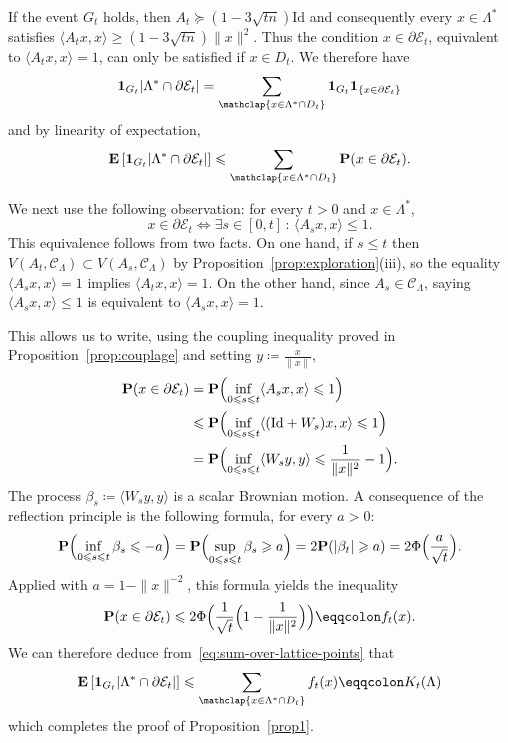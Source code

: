 \documentclass[12pt]{amsart}
\newcommand{\E}{\mathbf{E}}
\renewcommand{\P}{\mathbf{P}}
\newcommand{\Id}{\mathrm{Id}}
\newcommand{\scalar}[2]{\langle #1 , #2\rangle}
\renewcommand{\leq}{\leqslant}
\renewcommand{\geq}{\geqslant}
\theoremstyle{plain}
\theoremstyle{remark}
\begin{document}
If the event $G_t$ holds, then $A_t \succcurlyeq (1-3 \sqrt{tn}) \Id$ and consequently every $x \in \Lambda^*$ satisfies $\scalar{A_tx}{x} \geq (1-3\sqrt{tn}) \|x\|^2$. Thus the condition $x \in \partial \mathcal{E}_t$, equivalent to $\scalar{A_tx}{x}=1$, can only be satisfied if $x \in D_t$. We therefore have
\[ {\bf 1}_{G_t} |\Lambda^* \cap \partial\mathcal{E}_t|
= \sum_{\mathclap{x \in \Lambda^* \cap D_t}} {\bf 1}_{G_t} {\bf 1}_{\{
x \in \partial\mathcal{E}_t\}}
\]
and by linearity of expectation,
\begin{equation} \label{eq:sum-over-lattice-points}
\E \left[ {\bf 1}_{G_t} |\Lambda^* \cap \partial\mathcal{E}_t| \right]
\leq \sum_{\mathclap{x \in \Lambda^* \cap D_t}} \P(x \in \partial\mathcal{E}_t).
\end{equation}
 
We next use the following observation: for every $t>0$ and $x \in \Lambda^*$,
\[ x \in  \partial\mathcal{E}_t \iff \exists s \in [0,t] \, : \, \scalar{A_sx}{x} \leq 1 .\]
This equivalence follows from two facts. On one hand,
if $s \leq t$ then $V(A_t,\mathscr{C}_\Lambda) \subset V(A_s,\mathscr{C}_\Lambda)$ by Proposition~\ref{prop:exploration}(iii), so the equality $\scalar{A_sx}{x} = 1$ implies $\scalar{A_tx}{x}=1$. On the other hand, since $A_s \in \mathscr{C}_\Lambda$, saying $\scalar{A_sx}{x} \leq 1$ is equivalent to $\scalar{A_sx}{x} = 1$.
 
This allows us to write, using the coupling inequality proved in Proposition~\ref{prop:couplage} and setting $y \coloneqq \frac{x}{\|x\|}$,
\begin{align*} \P(x \in \partial\mathcal{E}_t) & =
 \P \Bigl( \inf_{0 \leq s \leq t} \scalar{A_sx}{x} \leq 1 \Bigr) \\
& \leq  \P \Bigl( \inf_{0 \leq s \leq t} \scalar{(\Id+W_s)x}{x} \leq 1 \Bigr) \\
& =  \P \Bigl( \inf_{0 \leq s \leq t} \scalar{W_sy}{y} \leq \frac{1}{\|x\|^2 } - 1 \Bigr).
\end{align*}
The process $\beta_s \coloneqq  \scalar{W_sy}{y}$ is a scalar Brownian motion. A consequence of the reflection principle \cite[Theorem 2.4]{LeGall13} is the following formula, for every $a>0$:
\[ \P \Bigl( \inf_{0 \leq s \leq t} \beta_s \leq -a \Bigr) =
\P \Bigl( \sup_{0 \leq s \leq t} \beta_s \geq a \Bigr) =
2 \P(|\beta_t| \geq a) =  2 \Phi \Bigl( \frac{a}{\sqrt{t}} \Bigr).
\]
Applied with $a=1-\|x\|^{-2}$, this formula yields the inequality
\[ \P(x \in \partial\mathcal{E}_t) \leq
 2 \Phi \Bigl( \frac{1}{\sqrt{t}}\Bigl( 1 - \frac{1}{\|x\|^2}\Bigr)\Bigr) \eqqcolon f_t(x).
\]
We can therefore deduce from~\eqref{eq:sum-over-lattice-points} that
\[ \E \left[ {\bf 1}_{G_t} |\Lambda^* \cap \partial\mathcal{E}_t| \right]
\leq \sum_{\mathclap{x \in \Lambda^* \cap D_t}} f_t(x) \eqqcolon K_t(\Lambda) \]
which completes the proof of Proposition~\ref{prop1}.
 
\end{document}

